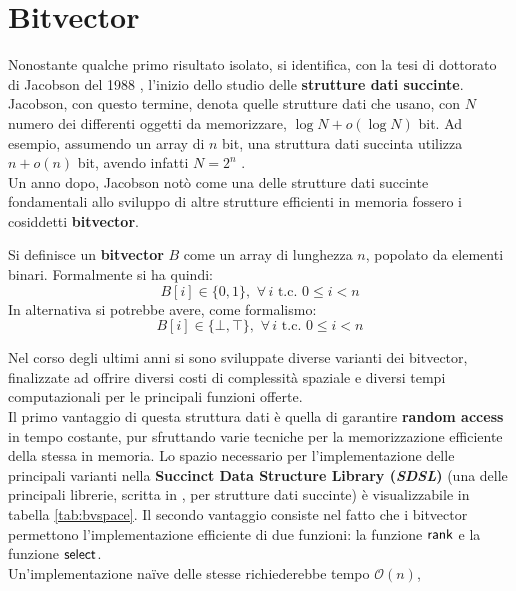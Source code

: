 \section{Bitvector}
\label{bvsec}
Nonostante qualche primo risultato isolato, si identifica, con la tesi di
dottorato di Jacobson 
del 1988 \cite{succinct}, l'inizio dello studio delle \textbf{strutture dati
  succinte}. Jacobson, con questo termine, denota quelle strutture dati che
usano, con $N$ numero dei differenti oggetti da memorizzare, $\log N+o(\log N)$
bit. Ad esempio, assumendo un array di $n$ bit, una struttura dati succinta
utilizza $n+o(n)$ bit, avendo infatti $N=2^n$ \cite{navarro}.\\
Un anno dopo, Jacobson \cite{jacobson} notò come una delle strutture
  dati succinte fondamentali allo sviluppo di altre strutture efficienti in
memoria fossero i cosiddetti \textbf{bitvector}.
\begin{definizione}
  Si definisce un \textbf{bitvector} $B$ come un array di lunghezza $n$,
  popolato da elementi binari. Formalmente si ha quindi:
  \begin{equation}
    \label{eq:bvdef1}
    B[i]\in\{0,1\},\,\,\forall\, i \mbox{ t.c. } 0\leq i < n
  \end{equation}
  In alternativa si potrebbe avere, come formalismo:
  \begin{equation}
    \label{eq:bvdef2}
    B[i]\in\{\bot,\top\},\,\,\forall\, i \mbox{ t.c. } 0\leq i < n
  \end{equation}
\end{definizione}
Nel corso degli ultimi anni si sono sviluppate diverse varianti dei
bitvector, finalizzate ad offrire diversi costi di complessità spaziale
e 
diversi tempi computazionali per le principali funzioni offerte.\\
Il primo vantaggio di questa struttura dati è quella di garantire \textbf{random
  access} in tempo costante, pur 
sfruttando varie tecniche per la memorizzazione efficiente della stessa in
memoria. Lo spazio necessario per l'implementazione delle principali varianti
nella \textbf{Succinct Data Structure Library (\textit{SDSL})} 
\cite{sdsl} (una delle principali librerie, scritta in , per
strutture dati succinte) è visualizzabile in tabella 
\ref{tab:bvspace}. Il secondo vantaggio consiste nel fatto che i
bitvector permettono l'implementazione efficiente di due funzioni: la funzione
$\mbox{\rm {\sf rank}}$ e la funzione $\mbox{\rm {\sf select}}$.\\
Un'implementazione na\"{i}ve delle stesse richiederebbe tempo $\mathcal{O}(n)$,
